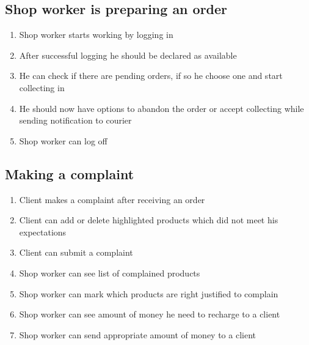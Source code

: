 \documentclass[../main.tex]{subfiles}
\begin{document}
\subsection{Shop worker is preparing an order}

\begin{enumerate}
    \item Shop worker starts working by logging in
    \item After successful logging he should be declared as available
    \item He can check if there are pending orders, if so he choose one and start collecting in
    \item He should now have options to abandon the order or accept collecting while sending notification to courier
    \item Shop worker can log off
\end{enumerate}

\subsection{Making a complaint}

\begin{enumerate}
    \item Client makes a complaint after receiving an order
    \item Client can add or delete highlighted products which did not meet his expectations
    \item Client can submit a complaint
    \item Shop worker can see list of complained products
    \item Shop worker can mark which products are right justified to complain
    \item Shop worker can see amount of money he need to recharge to a client
    \item Shop worker can send appropriate amount of money to a client
\end{enumerate}
\end{document}
